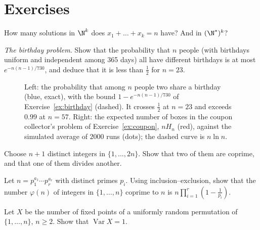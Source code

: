 
\section{Exercises}

\begin{exercise}[$\star$]\label{ex:stars}
How many solutions in $\N^k$ does $x_1+\dots+x_k=n$ have? And in $(\N^*)^k$?
\end{exercise}

\begin{exercise}[$\star$]\label{ex:birthday}
\emph{The birthday problem.} Show that the probability that $n$ people (with birthdays uniform and independent among 365 days) all have different birthdays is at most
$e^{-n(n-1)/730}$, and deduce that it is less than $\frac12$ for $n=23$.
\end{exercise}

\begin{figure}[ht]
\centering
{}
\caption{Left: the probability that among $n$ people two share a birthday (blue, exact), with the bound $1-e^{-n(n-1)/730}$ of Exercise~\ref{ex:birthday} (dashed). It crosses $\frac12$ at $n=23$ and exceeds $0.99$ at $n=57$. Right: the expected number of boxes in the coupon collector's problem of Exercise~\ref{ex:coupon}, $nH_n$ (red), against the simulated average of $2000$ runs (dots); the dashed curve is $n\ln n$.}
\label{fig:birthday}
\end{figure}

\begin{exercise}[$\star\star$]\label{ex:pigeon}
Choose $n+1$ distinct integers in $\{1,\dots,2n\}$. Show that two of them are coprime, and that one of them divides another.
\end{exercise}

\begin{exercise}[$\star\star$]\label{ex:phi}
Let $n=p_1^{a_1}\cdots p_r^{a_r}$ with distinct primes $p_i$. Using inclusion--exclusion, show that the number $\varphi(n)$ of integers in $\{1,\dots,n\}$ coprime to $n$ is
$n\prod_{i=1}^r\left(1-\frac1{p_i}\right)$.
\end{exercise}

\begin{exercise}[$\star\star$]\label{ex:fixedvar}
Let $X$ be the number of fixed points of a uniformly random permutation of $\{1,\dots,n\}$, $n\ge2$. Show that $\operatorname{Var}X=1$.
\end{exercise}

